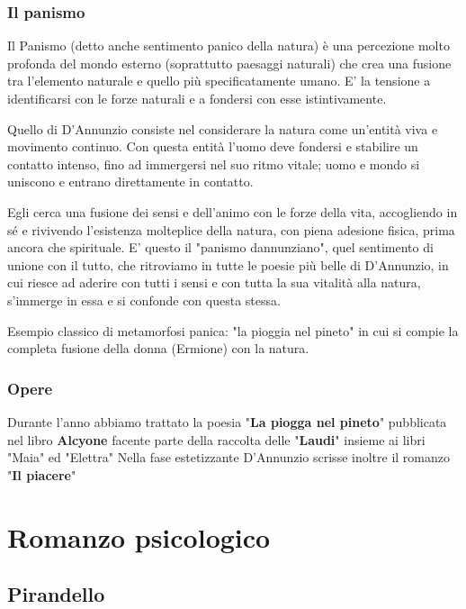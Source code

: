 \documentclass[10pt]{report}
\begin{document}
			\subsection[Panismo]{Il panismo}
			Il Panismo (detto anche sentimento panico della natura) è una percezione molto profonda del mondo esterno (soprattutto paesaggi naturali) che crea una fusione tra l'elemento naturale e quello più specificatamente umano. E' la tensione a identificarsi con le forze naturali e a fondersi con esse istintivamente.
			
			Quello di D'Annunzio consiste nel considerare la natura come un'entità viva e movimento continuo.
			Con questa entità l'uomo deve fondersi e stabilire un contatto intenso, fino ad immergersi nel suo ritmo vitale; uomo e mondo si uniscono e entrano direttamente in contatto. 
			
			
			Egli cerca una fusione dei sensi e dell'animo con le forze della vita, accogliendo in sé e rivivendo l'esistenza molteplice della natura, con piena adesione fisica, prima ancora che spirituale. E' questo il "panismo dannunziano", quel sentimento di unione con il tutto, che ritroviamo in tutte le poesie più belle di D'Annunzio, in cui riesce ad aderire con tutti i sensi e con tutta la sua vitalità alla natura, s'immerge in essa e si confonde con questa stessa.
			
			Esempio classico di metamorfosi panica: "la pioggia nel pineto" in cui si compie la completa fusione della donna (Ermione) con la natura.
			
			\subsection[Opere]{Opere}
			Durante l'anno abbiamo trattato la poesia "\textbf{La piogga nel pineto}" pubblicata nel libro \textbf{Alcyone} facente parte della raccolta delle "\textbf{Laudi}" insieme ai libri "Maia" ed "Elettra"
			Nella fase estetizzante D'Annunzio scrisse inoltre il romanzo "\textbf{Il piacere}"
	
	\chapter*{Romanzo psicologico}
	
	\section{Pirandello}
\end{document}
